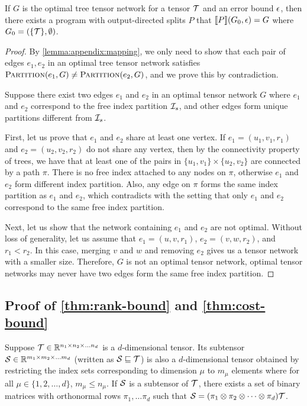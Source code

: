 \begin{theorem}
If $G$ is the optimal tree tensor network for a tensor $\mathcal{T}$ and an error bound $\epsilon$,
then there exists a program with output-directed splits $P$ that $\llbracket P \rrbracket(G_0, \epsilon) = G$ where $G_0 = (\{\mathcal{T}\},\emptyset)$.
\end{theorem}
\begin{proof}
By \cref{lemma:appendix:mapping}, we only need to show that each pair of edges $e_1, e_2$ in an optimal tree tensor network satisfies $\textsc{Partition}(e_1,G) \not= \textsc{Partition}(e_2, G)$, and we prove this by contradiction.

Suppose there exist two edges $e_1$ and $e_2$ in an optimal tensor network $G$ where $e_1$ and $e_2$ correspond to the free index partition $\mathcal{I}_s$, and other edges form unique partitions different from $\mathcal{I}_s$.

First, let us prove that $e_1$ and $e_2$ share at least one vertex.
%
If $e_1 = (u_1, v_1, r_1)$ and $e_2 = (u_2, v_2, r_2)$ do not share any vertex, then by the connectivity property of trees, we have that at least one of the pairs in $\{u_1, v_1\} \times \{u_2, v_2\}$ are connected by a path $\pi$.
%
There is no free index attached to any nodes on $\pi$, otherwise $e_1$ and $e_2$ form different index partition.
%
Also, any edge on $\pi$ forms the same index partition as $e_1$ and $e_2$, which contradicts with the setting that only $e_1$ and $e_2$ correspond to the same free index partition.

Next, let us show that the network containing $e_1$ and $e_2$ are not optimal.
%
Without loss of generality, let us assume that $e_1 = (u, v, r_1)$, $e_2 = (v, w, r_2)$, and $r_1 < r_2$.
%
In this case, merging $v$ and $w$ and removing $e_2$ gives us a tensor network with a smaller size.
%
Therefore, $G$ is not an optimal tensor network, \ie optimal tensor networks may never have two edges form the same free index partition.
\end{proof}

\subsection{Proof of \cref{thm:rank-bound} and \cref{thm:cost-bound}}
\begin{definition}[Subtensor]
Suppose $\mathcal{T} \in \mathbb{R}^{n_1 \times n_2 \times \ldots n_d}$ is a $d$-dimensional tensor. Its subtensor $\mathcal{S}  \in \mathbb{R}^{m_1 \times m_2 \times \ldots m_d}$ (written as $\mathcal{S} \sqsubseteq \mathcal{T}$) is also a $d$-dimensional tensor obtained by restricting the index sets corresponding to dimension $\mu$ to $m_\mu$ elements where for all $\mu \in \{1,2,\ldots, d\}$, $m_\mu \leq n_\mu$. If $\mathcal{S}$ is a subtensor of $\mathcal{T}$, there exists a set of binary matrices with orthonormal rows $\pi_1, \dots\pi_d$ such that $\mathcal{S} = (\pi_1 \otimes \pi_2 \otimes \cdots \otimes \pi_d) \mathcal{T}$.
\end{definition}

